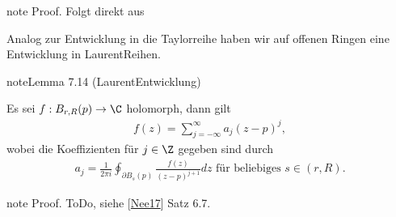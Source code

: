\documentclass[letterpaper,10pt,german]{jupyterBook}
\begin{document}
\begin{sphinxadmonition}{note}
\sphinxAtStartPar
Proof. Folgt direkt aus {\hyperref[\detokenize{complexanalysis/powerseries:lem:powerradius}]{}}
\end{sphinxadmonition}

\sphinxAtStartPar
Analog zur Entwicklung in die Taylorreihe haben wir auf offenen Ringen eine Entwicklung in Laurent\sphinxhyphen{}Reihen.
\label{complexanalysis/residuensatz:lem:laurent}
\begin{sphinxadmonition}{note}{Lemma 7.14 (Laurent\sphinxhyphen{}Entwicklung)}



\sphinxAtStartPar
Es sei \(f:B_{r,R}(p)\to\C\) holomorph, dann gilt
\begin{equation*}
\begin{split}f(z) = \sum_{j=-\infty}^\infty a_j (z-p)^j,\end{split}
\end{equation*}
\sphinxAtStartPar
wobei die Koeffizienten für \(j\in\Z\) gegeben sind durch
\begin{equation*}
\begin{split}a_j = \frac{1}{2\pi i} \oint_{\partial B_s(p)} \frac{f(z)}{(z-p)^{j+1}} dz \text{ für beliebiges } s\in (r,R).\end{split}
\end{equation*}\end{sphinxadmonition}

\begin{sphinxadmonition}{note}
\sphinxAtStartPar
Proof. ToDo, siehe {[}\hyperlink{cite.references:id13}{Nee17}{]} Satz 6.7.
\end{sphinxadmonition}
\end{document}
